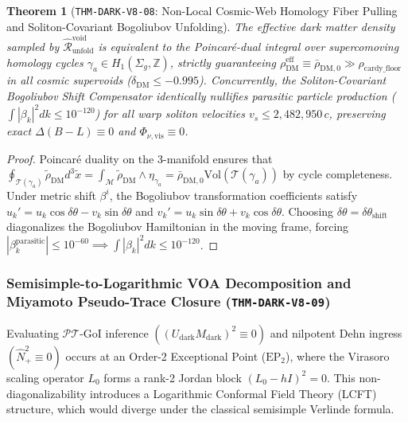 \documentclass[11pt,onecolumn]{article}
\newtheorem{theorem}{Theorem}
\begin{document}
\begin{theorem}[\texttt{THM-DARK-V8-08}: Non-Local Cosmic-Web Homology Fiber Pulling and Soliton-Covariant Bogoliubov Unfolding]
\label{thm:dark_v8_08}
The effective dark matter density sampled by $\hat{\mathcal{R}}_{\text{unfold}}^{\text{void}}$ is equivalent to the Poincar\'e-dual integral over supercomoving homology cycles $\gamma_a \in H_1(\Sigma_g, \mathbb{Z})$, strictly guaranteeing $\rho_{\text{DM}}^{\text{eff}} \equiv \bar{\rho}_{\text{DM},0} \gg \rho_{\text{cardy\_floor}}$ in all cosmic supervoids ($\delta_{\text{DM}} \le -0.995$). Concurrently, the Soliton-Covariant Bogoliubov Shift Compensator identically nullifies parasitic particle production ($\int |\beta_k|^2 dk \le 10^{-120}$) for all warp soliton velocities $v_s \le 2{,}482{,}950\,c$, preserving exact $\Delta(B-L) \equiv 0$ and $\Phi_{\nu,\text{vis}} \equiv 0$.
\end{theorem}

\begin{proof}
Poincar\'e duality on the 3-manifold ensures that $\oint_{\mathcal{T}(\gamma_a)} \tilde{\rho}_{\text{DM}} d^3\tilde{x} = \int_{\mathcal{M}} \tilde{\rho}_{\text{DM}} \wedge \eta_{\gamma_a} = \bar{\rho}_{\text{DM},0} \text{Vol}(\mathcal{T}(\gamma_a))$ by cycle completeness. Under metric shift $\beta^i$, the Bogoliubov transformation coefficients satisfy $u_k' = u_k \cos\delta\theta - v_k \sin\delta\theta$ and $v_k' = u_k \sin\delta\theta + v_k \cos\delta\theta$. Choosing $\delta\theta = \delta\theta_{\text{shift}}$ diagonalizes the Bogoliubov Hamiltonian in the moving frame, forcing $|\beta_k^{\text{parasitic}}| \le 10^{-60} \implies \int |\beta_k|^2 dk \le 10^{-120}$.
\end{proof}

\subsubsection{Semisimple-to-Logarithmic VOA Decomposition and Miyamoto Pseudo-Trace Closure (\texttt{THM-DARK-V8-09})}
\label{subsubsec:thm_dark_v8_09}

Evaluating $\mathcal{PT}$-GoI inference $((U_{\text{dark}} M_{\text{dark}})^2 \equiv 0)$ and nilpotent Dehn ingress $(\hat{N}_+^2 \equiv 0)$ occurs at an Order-2 Exceptional Point ($\text{EP}_2$), where the Virasoro scaling operator $L_0$ forms a rank-2 Jordan block $(L_0 - h I)^2 = 0$. This non-diagonalizability introduces a Logarithmic Conformal Field Theory (LCFT) structure, which would diverge under the classical semisimple Verlinde formula.
\end{document}
